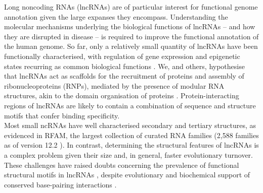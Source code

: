 \documentclass{bmcart}
\begin{document}
Long noncoding RNAs (lncRNAs) are of particular interest for functional genome
annotation given the large expanses they encompass.  Understanding the
molecular mechanisms underlying the biological functions of lncRNAs -- and how
they are disrupted in disease -- is required to improve the functional
annotation of the human genome. So far, only a relatively small quantity of
lncRNAs have been functionally characterised, with regulation of gene
expression and epigenetic states recurring as common biological functions
\cite{morris2014rise,engreitz2016long}.  We, and others, hypothesise that
lncRNAs act as scaffolds for the recruitment of proteins and assembly of
ribonucleoproteins (RNPs), mediated by the presence of modular RNA structures,
akin to the domain organisation of proteins
\cite{zappulla2006rna,hogg2008structured,rinn2012genome,mercer2013structure,smith2013widespread,chujo2016architectural,blythe2016ins}.
Protein-interacting regions of lncRNAs are likely to contain a combination of
sequence and structure motifs that confer binding specificity.\\

Most small ncRNAs have well characterised secondary and tertiary structures, as
evidenced in RFAM, the largest collection of curated RNA families (2,588
families as of version 12.2 \cite{rfam12}). In contrast, determining the
structural features of lncRNAs is a complex problem given their size and, in
general, faster evolutionary turnover. These challenges have raised doubts
concerning the prevalence of functional structural  motifs in lncRNAs
\cite{eddy2014computational,rivas2016statistical}, despite evolutionary and
biochemical support of conserved base-pairing interactions
\cite{smith2013widespread,spitale2015structural,lu2016rna}.\\

  
\end{document}
